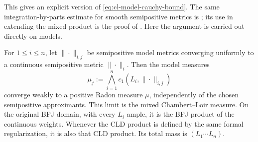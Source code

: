 This gives an explicit version of \eqref{eq:cl-model-cauchy-bound}. The same integration-by-parts estimate for smooth semipositive metrics is \cite[Lemma~8.6]{BE21}; its use in extending the mixed product is the proof of \cite[Theorem~8.4]{BE21}. Here the argument is carried out directly on models.

\begin{theorem}\label{thm:cma-continuous-comparison}
For $1\leq i\leq n$, let
$\|\cdot\|_{i,j}$ be semipositive model metrics converging uniformly to a
continuous semipositive metric $\|\cdot\|_i$.
Then the model measures
\[
 \mu_j:=\bigwedge_{i=1}^n c_1(L_i,\|\cdot\|_{i,j})
\tag{64.7}\label{eq:cma-approximating-measures}
\]
converge weakly to a positive Radon measure $\mu$, independently of the
chosen semipositive approximants.
This limit is the mixed Chambert--Loir measure.
On the original BFJ domain, with every $L_i$ ample, it is the BFJ product of the continuous weights.
Whenever the CLD product is defined by the same formal regularization, it is
also that CLD product.
Its total mass is $(L_1\cdots L_n)$.
\end{theorem}

